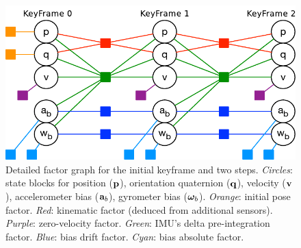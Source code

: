 


\begin{figure}[tb]
\centering
\includegraphics[scale=0.8]{figures/graph_exploded.pdf}
\caption{
Detailed factor graph for the initial keyframe and two steps. 
\emph{Circles}: state blocks for position (${\bf p}$), orientation quaternion (${\bf q}$), velocity (${\bf v}$), accelerometer bias (${\bf a}_b$), gyrometer bias (${{\bm \omega}}_b$). 
\emph{Orange}: initial pose factor. 
\emph{Red}: kinematic factor (deduced from additional sensors). 
\emph{Purple}: zero-velocity factor. 
\emph{Green}: IMU's delta pre-integration factor. 
\emph{Blue}: bias drift factor. 
\emph{Cyan}: bias absolute factor. 
}
\label{fig:factor_graph}
\end{figure}



